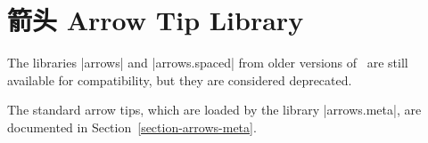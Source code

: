 %
%
%


\section{箭头 Arrow Tip Library}
\label{section-library-arrows}

The libraries |arrows| and |arrows.spaced| from older versions of \pgfname\ are
still available for compatibility, but they are considered deprecated.

The standard arrow tips, which are loaded by the library |arrows.meta|, are
documented in Section~\ref{section-arrows-meta}.


